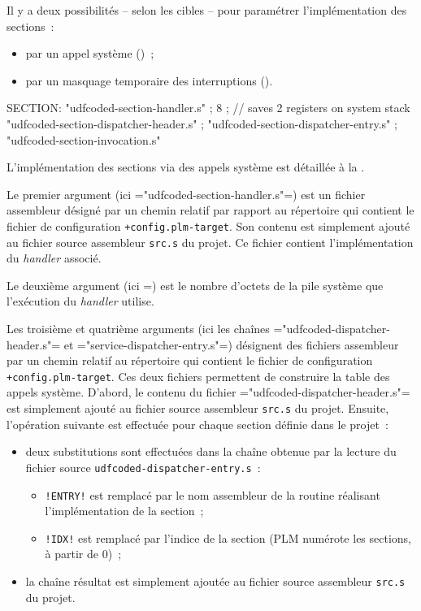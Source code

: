 
Il y a deux possibilités -- selon les cibles -- pour paramétrer l'implémentation des sections~:
\begin{itemize}
  \item par un appel système ()~;
  \item par un masquage temporaire des interruptions ().
\end{itemize}


\begin{PLM}
SECTION:
  "udfcoded-section-handler.s" ;
  8 ; // saves 2 registers on system stack
  "udfcoded-section-dispatcher-header.s" ;
  "udfcoded-section-dispatcher-entry.s" ;
  "udfcoded-section-invocation.s"
\end{PLM}

L'implémentation des sections via des appels système est détaillée à la .

Le premier argument (ici \plm="udfcoded-section-handler.s"=) est un fichier assembleur désigné par un chemin relatif par rapport au répertoire qui contient le fichier de configuration \texttt{+config.plm-target}. Son contenu est simplement ajouté au fichier source assembleur \texttt{src.s} du projet. Ce fichier contient l'implémentation du \emph{handler} associé.

Le deuxième argument (ici =) est le nombre d'octets de la pile système que l'exécution du \emph{handler} utilise.

Les troisième et quatrième arguments (ici les chaînes \plm="udfcoded-dispatcher-header.s"= et \plm="service-dispatcher-entry.s"=) désignent des fichiers assembleur par un chemin relatif au répertoire qui contient le fichier de configuration \texttt{+config.plm-target}. Ces deux fichiers permettent de construire la table des appels système. D'abord, le contenu du fichier \plm="udfcoded-dispatcher-header.s"= est simplement ajouté au fichier source assembleur \texttt{src.s} du projet. Ensuite, l'opération suivante est effectuée pour chaque section définie dans le projet~:
\begin{itemize}
  \item deux substitutions sont effectuées dans la chaîne obtenue par la lecture du fichier source \texttt{udfcoded-dispatcher-entry.s}~:
  \begin{itemize}
    \item \texttt{!ENTRY!} est remplacé par le nom assembleur de la routine réalisant l'implémentation de la section~;
    \item \texttt{!IDX!} est remplacé par l'indice de la section (PLM numérote les sections, à partir de $0$)~;
  \end{itemize}
  \item la chaîne résultat est simplement ajoutée au fichier source assembleur \texttt{src.s} du projet.
\end{itemize}

